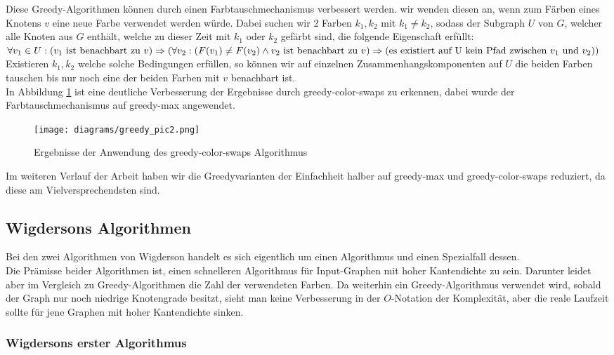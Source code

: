 \documentclass[11pt]{article}
\begin{document}
Diese Greedy-Algorithmen können durch einen Farbtauschmechanismus verbessert werden.
wir wenden diesen an, wenn zum Färben eines Knotens $v$ eine neue Farbe verwendet werden würde.
Dabei suchen wir 2 Farben $k_1,k_2$ mit $k_1\neq k_2$, 
sodass der Subgraph $U$ von $G$, 
welcher alle Knoten aus $G$ enthält, 
welche zu dieser Zeit mit $k_1$ oder $k_2$ gefärbt sind, die folgende Eigenschaft erfüllt:\\
$\forall v_1\in U : (v_1\text{ ist benachbart zu }v) \Rightarrow\\
 (\forall v_2 : (F(v_1)\neq F(v_2) \land v_2\text{ ist benachbart zu }v)\Rightarrow\\
  (\text{es existiert auf U kein Pfad zwischen $v_1$ und $v_2$}))$\\
Existieren $k_1,k_2$ welche solche Bedingungen erfüllen, 
so können wir auf einzelnen Zusammenhangskomponenten auf $U$ die beiden Farben tauschen 
bis nur noch eine der beiden Farben mit $v$ benachbart ist.\\
In Abbildung \ref{fig:greedy2} ist eine deutliche Verbesserung der Ergebnisse durch greedy-color-swaps zu erkennen,
dabei wurde der Farbtauschmechanismus auf greedy-max angewendet.
\begin{figure}
  \texttt{[image: diagrams/greedy\_pic2.png]}
  \caption{Ergebnisse der Anwendung des greedy-color-swaps Algorithmus}
  \label{fig:greedy2}
\end{figure}
Im weiteren Verlauf der Arbeit haben wir die Greedyvarianten der Einfachheit halber auf greedy-max und greedy-color-swaps reduziert, 
da diese am Vielversprechendsten sind.

\subsection{Wigdersons Algorithmen} 

Bei den zwei Algorithmen von Wigderson handelt es sich eigentlich um einen Algorithmus und einen Spezialfall dessen. \\
Die Prämisse beider Algorithmen ist, einen schnelleren Algorithmus für Input-Graphen mit hoher Kantendichte zu sein.
Darunter leidet aber im Vergleich zu Greedy-Algorithmen die Zahl der verwendeten Farben. Da weiterhin ein Greedy-Algorithmus verwendet wird,
sobald der Graph nur noch niedrige Knotengrade besitzt, sieht man keine Verbesserung in der $O$-Notation der Komplexität, aber die reale Laufzeit sollte
für jene Graphen mit hoher Kantendichte sinken.

\subsubsection{Wigdersons erster Algorithmus}
\end{document}
